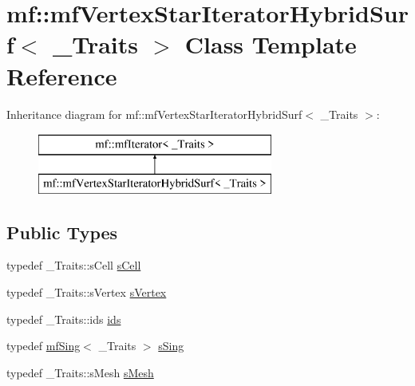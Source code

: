 \hypertarget{classmf_1_1mfVertexStarIteratorHybridSurf}{
\section{mf::mfVertexStarIteratorHybridSurf$<$ \_\-Traits $>$ Class Template Reference}
\label{classmf_1_1mfVertexStarIteratorHybridSurf}
}
Inheritance diagram for mf::mfVertexStarIteratorHybridSurf$<$ \_\-Traits $>$:\begin{figure}[H]
\begin{center}
\leavevmode
\includegraphics[height=2.000000cm]{classmf_1_1mfVertexStarIteratorHybridSurf}
\end{center}
\end{figure}
\subsection*{Public Types}
\begin{DoxyCompactItemize}
\item 
typedef \_\-Traits::sCell \hyperlink{classmf_1_1mfVertexStarIteratorHybridSurf_aae6c12237bca0c9f2b89ba3c4de79956}{sCell}
\item 
typedef \_\-Traits::sVertex \hyperlink{classmf_1_1mfVertexStarIteratorHybridSurf_af127643c84159641fa27dcae42d3827b}{sVertex}
\item 
typedef \_\-Traits::ids \hyperlink{classmf_1_1mfVertexStarIteratorHybridSurf_a32d570ad58eb0990e038c4058730d16e}{ids}
\item 
typedef \hyperlink{classmf_1_1mfSing}{mfSing}$<$ \_\-Traits $>$ \hyperlink{classmf_1_1mfVertexStarIteratorHybridSurf_ad9d3b4599b8c75447e1a84cc9fcade36}{sSing}
\item 
typedef \_\-Traits::sMesh \hyperlink{classmf_1_1mfVertexStarIteratorHybridSurf_a83c02395712edc51c7887c7256718c2c}{sMesh}
\end{DoxyCompactItemize}
